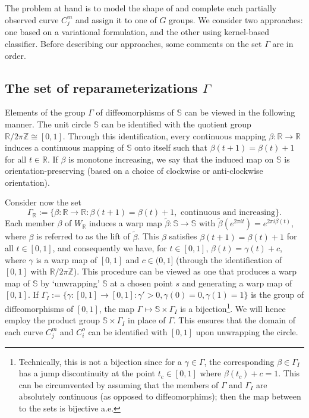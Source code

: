\documentclass[11pt]{amsart}
\newcommand{\C}{C}
\newcommand{\uc}{\mathbb{S}}
\theoremstyle{definition}
\begin{document}
The problem at hand is to model the shape of and complete each partially observed curve $\C^m_j$ and assign it to one of $G$ groups. We consider two approaches: one based on a variational formulation, and the other using kernel-based classifier. Before describing our approaches, some comments on the set $\Gamma$ are in order. 

\subsection{The set of reparameterizations $\Gamma$}
Elements of the group $\Gamma$ of diffeomorphisms of $\uc$ can be viewed in the following manner. The unit circle $\uc$ can be identified with the quotient group $\mathbb{R}/2\pi \mathbb{Z} \cong [0,1]$. Through this identification, every continuous mapping $\beta: \mathbb{R} \to \mathbb{R}$ induces a continuous mapping of $\uc$ onto itself such that $\beta(t+1)=\beta(t)+1$ for all $t \in \mathbb{R}$. If $\beta$ is monotone increasing, we say that the induced map on $\uc$ is orientation-preserving (based on a choice of clockwise or anti-clockwise orientation).

Consider now the set $$\Gamma_\mathbb{R}:=\{\beta:\mathbb{R}\to \mathbb{R}: \beta(t+1)=\beta(t)+1, \text{ continuous and increasing}\}.$$ Each member $\beta$ of $W_\mathbb{R}$ induces a warp map $\tilde{\beta}:\uc \to \uc$ with $\tilde{\beta}(e^{2\pi it})=e^{2\pi i\beta(t)}$, where $\beta$ is referred to as the lift of $\tilde{\beta}$. This $\beta$ satisfies $\beta(t+1)=\beta(t)+1$ for all $t \in [0,1]$, and consequently we have, for $t \in [0,1]$, $\beta(t)=\gamma(t)+c $, where $\gamma$ is a warp map of $[0,1]$ and $c \in (0,1]$ (through the identification of $[0,1]$ with $\mathbb{R}/2\pi \mathbb{Z}$). This procedure can be viewed as one that produces a warp map of $\uc$ by `unwrapping' $\uc$ at a chosen point $s$ and generating a warp map of $[0,1]$.
If $\Gamma_I:=\{\gamma:[0,1] \to [0,1]: \gamma'>0,\gamma(0)=0, \gamma(1)=1\}$ is the group of diffeomorphisms of $[0,1]$, the map $\Gamma \mapsto \uc \times \Gamma_I$ is a bijection\footnote{Technically, this is not a bijection since for a $\gamma \in \Gamma$, the corresponding $\beta \in \Gamma_I$ has a jump discontinuity at the point $t_c \in [0,1]$ where $\beta(t_c)+c=1$. This can be circumvented by assuming that the members of $\Gamma$ and $\Gamma_I$ are absolutely continuous (as opposed to diffeomorphims); then the map between to the sets is bijective a.e.}. We will hence employ the product group $\uc \times \Gamma_I$ in place of $\Gamma$. This ensures that the domain of each curve $C_j^m$ and $C^o_i$ can be identified with $[0,1]$ upon unwrapping the circle. 
\end{document}
